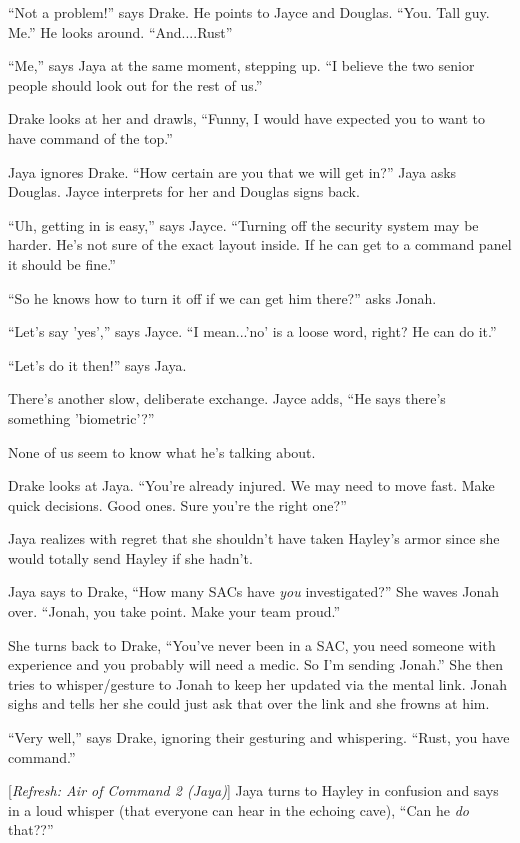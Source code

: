 ``Not a problem!'' says Drake.  He points to Jayce and Douglas.  ``You. Tall guy.  Me.''  He looks around.  ``And....Rust''

``Me,'' says Jaya at the same moment, stepping up.  ``I believe the two senior people should look out for the rest of us.''

Drake looks at her and drawls, ``Funny, I would have expected you to want to have command of the top.''

Jaya ignores Drake.  ``How certain are you that we will get in?'' Jaya asks Douglas.  Jayce interprets for her and Douglas signs back.

``Uh, getting in is easy,'' says Jayce.  ``Turning off the security system may be harder.  He's not sure of the exact layout inside.  If he can get to a command panel it should be fine.''

``So he knows how to turn it off if we can get him there?'' asks Jonah.

``Let's say 'yes','' says Jayce.  ``I mean...'no' is a  loose word, right?  He can do it.''

``Let's do it then!'' says Jaya.

There's another slow, deliberate exchange.  Jayce adds, ``He says there's something 'biometric'?''

None of us seem to know what he's talking about.

Drake looks at Jaya.  ``You're already injured.  We may need to move fast.  Make quick decisions.  Good ones.  Sure you're the right one?''

Jaya realizes with regret that she shouldn't have taken Hayley's armor since she would totally send Hayley if she hadn't.

Jaya says to Drake, ``How many SACs have \textit{you} investigated?''  She waves Jonah over. ``Jonah, you take point. Make your team proud.''

She turns back to Drake, ``You've never been in a SAC, you need someone with experience and you probably will need a medic.  So I'm sending Jonah.''  She then tries to whisper/gesture to Jonah to keep her updated via the mental link.  Jonah sighs and tells her she could just ask that over the link and she frowns at him.

``Very well,'' says Drake, ignoring their gesturing and whispering.  ``Rust, you have command.''

{[}\textit{Refresh: Air of Command 2 (Jaya)}{]} Jaya turns to Hayley in confusion and says in a loud whisper (that everyone can hear in the echoing cave), ``Can he \textit{do} that??''

